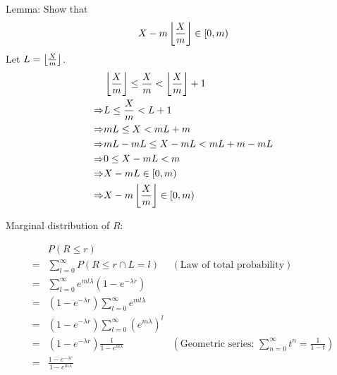 \documentclass{article}
\begin{document}
Lemma: Show that
\[X-m\left\lfloor\frac{X}{m}\right\rfloor \in [0,m) \]
Let \(L=\left\lfloor\frac{X}{m}\right\rfloor\).
\begin{align*}
    & \left\lfloor\frac{X}{m}\right\rfloor \leq \frac{X}{m} < \left\lfloor\frac{X}{m}\right\rfloor+1 \\
    \Rightarrow& L \leq \frac{X}{m} < L+1 \\
    \Rightarrow& mL \leq X < mL+m \\
    \Rightarrow& mL-mL \leq X-mL < mL+m-mL \\
    \Rightarrow& 0 \leq X-mL < m \\
    \Rightarrow& X-mL \in [0,m) \\
    \Rightarrow& X-m\left\lfloor\frac{X}{m}\right\rfloor \in [0,m)
\end{align*}

Marginal distribution of \(R\):

\begin{align*}
    & P(R\leq r) \\
    =& \sum_{l=0}^\infty P(R\leq r \cap L=l) & (\text{Law of total probability}) \\
    =& \sum_{l=0}^\infty e^{ml\lambda}(1-e^{-\lambda r}) \\
    =& (1-e^{-\lambda r})\sum_{l=0}^\infty e^{ml\lambda} \\
    =& (1-e^{-\lambda r})\sum_{l=0}^\infty (e^{m\lambda})^l \\
    =& (1-e^{-\lambda r})\frac{1}{1-e^{m\lambda}} & (\text{Geometric series: }\sum_{n=0}^\infty t^n=\frac{1}{1-t}) \\
    =& \frac{1-e^{-\lambda r}}{1-e^{m\lambda}} \\
\end{align*}
\end{document}
